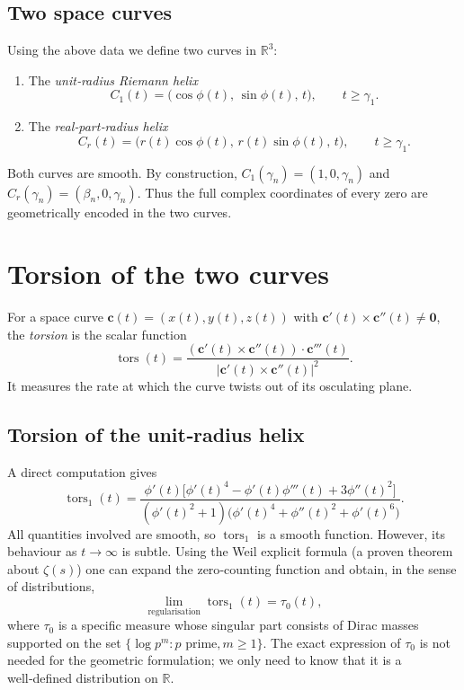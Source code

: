 \documentclass[12pt,a4paper]{article}
\newcommand{\R}{\mathbb{R}}
\DeclareMathOperator{\tors}{tors}
\begin{document}
\subsection{Two space curves}
Using the above data we define two curves in $\R^3$:

\begin{enumerate}
\item The \emph{unit‑radius Riemann helix}
\[
C_1(t)=\bigl(\cos\phi(t),\,\sin\phi(t),\,t\bigr),\qquad t\ge\gamma_1 .
\]
\item The \emph{real‑part‑radius helix}
\[
C_r(t)=\bigl(r(t)\cos\phi(t),\,r(t)\sin\phi(t),\,t\bigr),\qquad t\ge\gamma_1 .
\]
\end{enumerate}
Both curves are smooth.  By construction, $C_1(\gamma_n)=(1,0,\gamma_n)$ and $C_r(\gamma_n)=(\beta_n,0,\gamma_n)$.  Thus the full complex coordinates of every zero are geometrically encoded in the two curves.

\section{Torsion of the two curves}

For a space curve $\mathbf{c}(t)=(x(t),y(t),z(t))$ with $\mathbf{c}'(t)\times\mathbf{c}''(t)\neq\mathbf{0}$, the \emph{torsion} is the scalar function
\[
\tors(t)=\frac{(\mathbf{c}'(t)\times\mathbf{c}''(t))\cdot\mathbf{c}'''(t)}
                 {|\mathbf{c}'(t)\times\mathbf{c}''(t)|^2}.
\]
It measures the rate at which the curve twists out of its osculating plane.

\subsection{Torsion of the unit‑radius helix}
A direct computation gives
\[
\tors_1(t)=\frac{\phi'(t)\bigl[\phi'(t)^4-\phi'(t)\phi'''(t)+3\phi''(t)^2\bigr]}
                   {(\phi'(t)^2+1)\bigl(\phi'(t)^4+\phi''(t)^2+\phi'(t)^6\bigr)} .
\tag{1}
\]
All quantities involved are smooth, so $\tors_1$ is a smooth function.  However, its behaviour as $t\to\infty$ is subtle.  Using the Weil explicit formula (a proven theorem about $\zeta(s)$) one can expand the zero‑counting function and obtain, in the sense of distributions,
\[
\lim_{\text{regularisation}} \tors_1(t) = \tau_0(t),
\]
where $\tau_0$ is a specific measure whose singular part consists of Dirac masses supported on the set $\{\log p^m : p\text{ prime}, m\ge 1\}$.  The exact expression of $\tau_0$ is not needed for the geometric formulation; we only need to know that it is a well‑defined distribution on $\R$.
\end{document}
